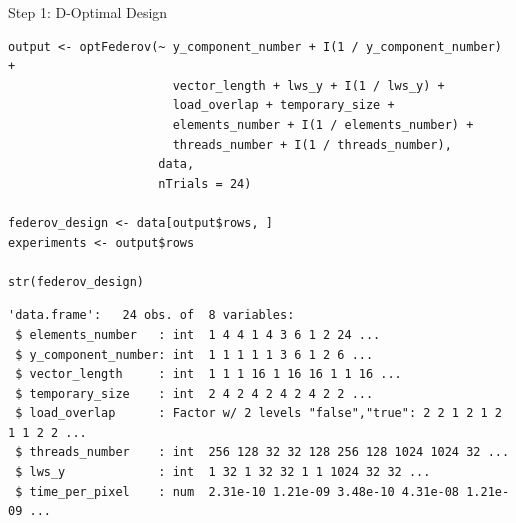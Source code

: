 \documentclass[10pt, compress, aspectratio=169, xcolor={table,usenames,dvipsnames}]{beamer}
\begin{document}
\begin{frame}[fragile,label={sec:orgc86592e}]{Step 1: D-Optimal Design}
 \scriptsize
\lstset{language=r,label= ,caption= ,captionpos=b,numbers=none}
\begin{lstlisting}
output <- optFederov(~ y_component_number + I(1 / y_component_number) +
                       vector_length + lws_y + I(1 / lws_y) +
                       load_overlap + temporary_size +
                       elements_number + I(1 / elements_number) +
                       threads_number + I(1 / threads_number),
                     data,
                     nTrials = 24)

federov_design <- data[output$rows, ]
experiments <- output$rows

str(federov_design)
\end{lstlisting}

\begin{verbatim}
'data.frame':	24 obs. of  8 variables:
 $ elements_number   : int  1 4 4 1 4 3 6 1 2 24 ...
 $ y_component_number: int  1 1 1 1 1 3 6 1 2 6 ...
 $ vector_length     : int  1 1 1 16 1 16 16 1 1 16 ...
 $ temporary_size    : int  2 4 2 4 2 4 2 4 2 2 ...
 $ load_overlap      : Factor w/ 2 levels "false","true": 2 2 1 2 1 2 1 1 2 2 ...
 $ threads_number    : int  256 128 32 32 128 256 128 1024 1024 32 ...
 $ lws_y             : int  1 32 1 32 32 1 1 1024 32 32 ...
 $ time_per_pixel    : num  2.31e-10 1.21e-09 3.48e-10 4.31e-08 1.21e-09 ...
\end{verbatim}

\normalsize
\end{frame}
\end{document}
